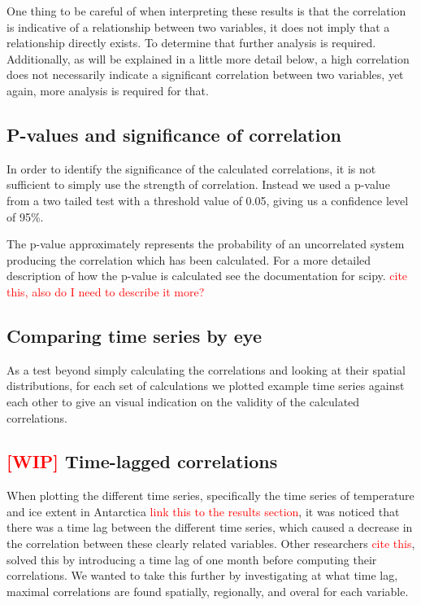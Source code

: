 \documentclass[../main.tex]{subfiles}
\begin{document}
One thing to be careful of when interpreting these results is that the correlation is indicative of a relationship between two variables, it does not imply that a relationship directly exists. To determine that further analysis is required. Additionally, as will be explained in a little more detail below, a high correlation does not necessarily indicate a significant correlation between two variables, yet again, more analysis is required for that.

\subsection{P-values and significance of correlation}
In order to identify the significance of the calculated correlations, it is not sufficient to simply use the strength of correlation. Instead we used a p-value from a two tailed test with a threshold value of 0.05, giving us a confidence level of 95\%.

The p-value approximately represents the probability of an uncorrelated system producing the correlation which has been calculated. For a more detailed description of how the p-value is calculated see the documentation for scipy. \textcolor{red}{cite this, also do I need to describe it more?}


\subsection{Comparing time series by eye}
As a test beyond simply calculating the correlations and looking at their spatial distributions, for each set of calculations we plotted example time series against each other to give an visual indication on the validity of the calculated correlations.


\subsection{\textcolor{red}{[WIP]} Time-lagged correlations}
When plotting the different time series, specifically the time series of temperature and ice extent in Antarctica \textcolor{red}{link this to the results section}, it was noticed that there was a time lag between the different time series, which caused a decrease in the correlation between these clearly related variables. Other researchers \textcolor{red}{cite this}, solved this by introducing a time lag of one month before computing their correlations. We wanted to take this further by investigating at what time lag, maximal correlations are found spatially, regionally, and overal for each variable.
\end{document}
